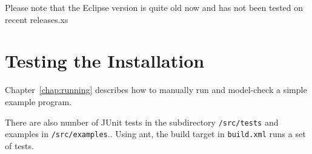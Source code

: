 Please note that the Eclipse version is quite old now and has not been tested on recent releases.xs

\section{Testing the Installation}

Chapter~\ref{chap:running} describes how to manually run and model-check a simple example program.

There are also number of JUnit tests in the subdirectory \texttt{/src/tests} and examples in \texttt{/src/examples}..  Using ant, the build target in \texttt{build.xml} runs a set of tests.

